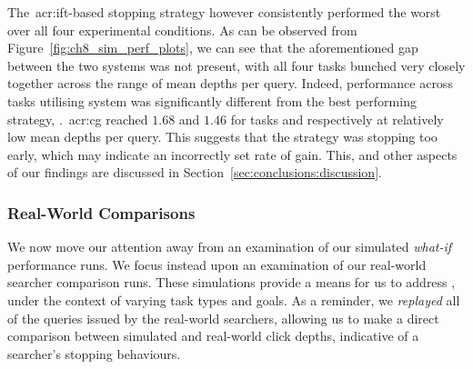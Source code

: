 The~\gls{acr:ift}-based stopping strategy  however consistently performed the worst over all four experimental conditions. As can be observed from Figure~\ref{fig:ch8_sim_perf_plots}, we can see that the aforementioned gap between the two systems was not present, with all four tasks bunched very closely together across the range of mean depths per query. Indeed, performance across tasks utilising system  was significantly different from the best performing strategy, .~\gls{acr:cg} reached $1.68$ and $1.46$ for tasks  and  respectively at relatively low mean depths per query. This suggests that the strategy was stopping too early, which may indicate an incorrectly set rate of gain. This, and other aspects of our findings are discussed in Section~\ref{sec:conclusions:discussion}.

\subsubsection{Real-World Comparisons}\label{sec:diversity:simulated:results:comparisons}
We now move our attention away from an examination of our simulated \emph{what-if} performance runs. We focus instead upon an examination of our real-world searcher comparison runs. These simulations provide a means for us to address , under the context of varying task types and goals. As a reminder, we \emph{replayed} all of the queries issued by the real-world searchers, allowing us to make a direct comparison between simulated and real-world click depths, indicative of a searcher's stopping behaviours.

